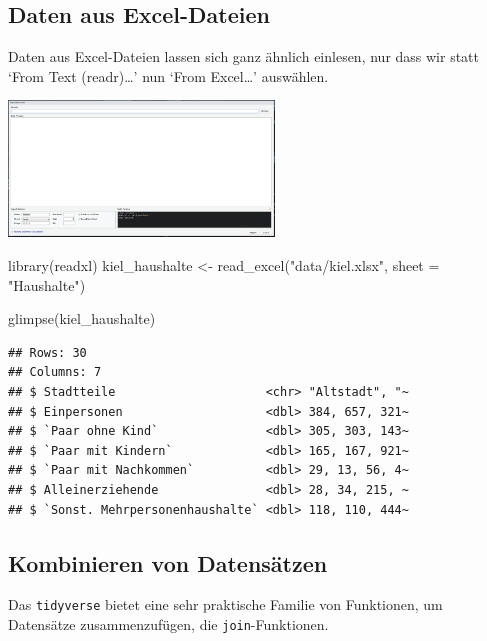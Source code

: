 \documentclass[
]{book}
\newenvironment{Shaded}{\begin{snugshade}}{\end{snugshade}}
\newcommand{\AttributeTok}[1]{\textcolor[rgb]{0.77,0.63,0.00}{#1}}
\newcommand{\FunctionTok}[1]{\textcolor[rgb]{0.00,0.00,0.00}{#1}}
\newcommand{\NormalTok}[1]{#1}
\newcommand{\OtherTok}[1]{\textcolor[rgb]{0.56,0.35,0.01}{#1}}
\newcommand{\StringTok}[1]{\textcolor[rgb]{0.31,0.60,0.02}{#1}}
\begin{document}
\hypertarget{daten-aus-excel-dateien}{%
\subsection{Daten aus Excel-Dateien}\label{daten-aus-excel-dateien}}

Daten aus Excel-Dateien lassen sich ganz ähnlich einlesen, nur dass wir statt `From Text (readr)\ldots{}' nun `From Excel\ldots{}' auswählen.

\begin{center}\includegraphics[width=200pt]{imgs/read_excel} \end{center}

\begin{Shaded}
\begin{Highlighting}[]
\FunctionTok{library}\NormalTok{(readxl)}
\NormalTok{kiel\_haushalte }\OtherTok{\textless{}{-}} \FunctionTok{read\_excel}\NormalTok{(}\StringTok{"data/kiel.xlsx"}\NormalTok{, }\AttributeTok{sheet =} \StringTok{"Haushalte"}\NormalTok{)}

\FunctionTok{glimpse}\NormalTok{(kiel\_haushalte)}
\end{Highlighting}
\end{Shaded}

\begin{verbatim}
## Rows: 30
## Columns: 7
## $ Stadtteile                     <chr> "Altstadt", "~
## $ Einpersonen                    <dbl> 384, 657, 321~
## $ `Paar ohne Kind`               <dbl> 305, 303, 143~
## $ `Paar mit Kindern`             <dbl> 165, 167, 921~
## $ `Paar mit Nachkommen`          <dbl> 29, 13, 56, 4~
## $ Alleinerziehende               <dbl> 28, 34, 215, ~
## $ `Sonst. Mehrpersonenhaushalte` <dbl> 118, 110, 444~
\end{verbatim}

\hypertarget{kombinieren-von-datensuxe4tzen}{%
\subsection{Kombinieren von Datensätzen}\label{kombinieren-von-datensuxe4tzen}}

Das \texttt{tidyverse} bietet eine sehr praktische Familie von Funktionen, um Datensätze zusammenzufügen, die \texttt{join}-Funktionen.
\end{document}
